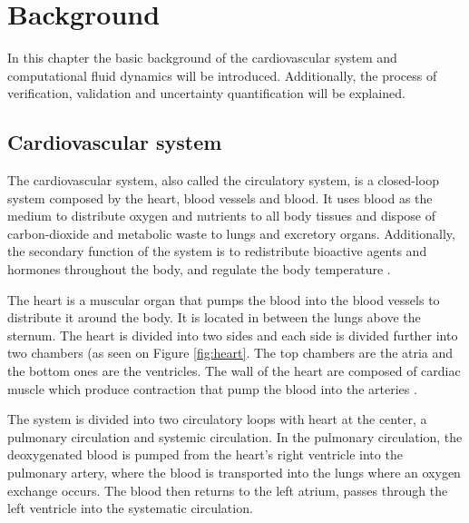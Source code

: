 \chapter{Background}
\label{chapterlabel3}
In this chapter the basic background of the cardiovascular system and computational fluid dynamics will be introduced. Additionally, the process of verification, validation and uncertainty quantification will be explained.


\section{Cardiovascular system}
The cardiovascular system, also called the circulatory system, is a closed-loop system composed by the heart, blood vessels and blood. It uses blood as the medium to distribute oxygen and nutrients to all body tissues and dispose of carbon-dioxide and metabolic waste to lungs and excretory organs. Additionally, the secondary function of the system is to redistribute bioactive agents and hormones throughout the body, and regulate the body temperature \cite{Levick2010Introduction5ed}.\par

The heart is a muscular organ that  pumps the blood into the blood vessels to distribute it around the body. It is located in between the lungs above the sternum. The heart is divided into two sides and each side is divided further into two chambers (as seen on Figure \ref{fig:heart}. The top chambers are the atria and the bottom ones are the ventricles. The wall of the heart are composed of cardiac muscle which produce contraction that pump the blood into the arteries \cite{aaronson2012cardiovascular,tortora2017introduction}. \par

The system is divided into two circulatory loops with heart at the center, a pulmonary circulation and systemic circulation. In the pulmonary circulation, the deoxygenated blood is pumped from the heart's right ventricle into the pulmonary artery, where the blood is transported into the lungs where an oxygen exchange occurs. The blood then returns to the left atrium, passes through the left ventricle into the systematic circulation\cite{Levick2010Introduction5ed,tortora2017introduction}. \par



